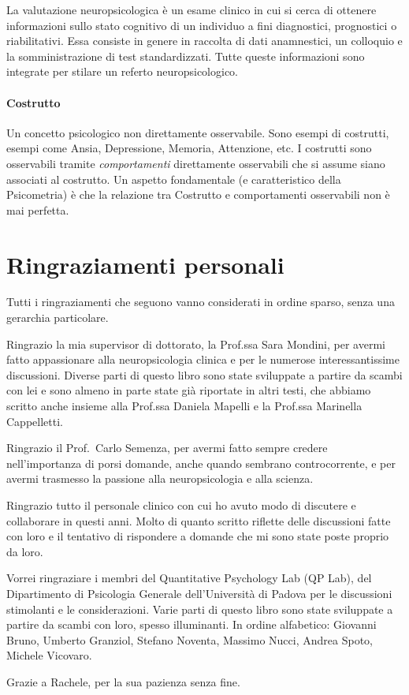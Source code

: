 \documentclass[
  italian,
  letterpaper,
  paper=6in:9in,
  pagesize=pdftex,
  headinclude=on,
  footinclude=on,
  11pt]{scrbook}
\begin{document}
La valutazione neuropsicologica è un esame clinico in cui si cerca di
ottenere informazioni sullo stato cognitivo di un individuo a fini
diagnostici, prognostici o riabilitativi. Essa consiste in genere in
raccolta di dati anamnestici, un colloquio e la somministrazione di test
standardizzati. Tutte queste informazioni sono integrate per stilare un
referto neuropsicologico.

\subsubsection*{Costrutto}\label{costrutto}

Un concetto psicologico non direttamente osservabile. Sono esempi di
costrutti, esempi come Ansia, Depressione, Memoria, Attenzione, etc. I
costrutti sono osservabili tramite \emph{comportamenti} direttamente
osservabili che si assume siano associati al costrutto. Un aspetto
fondamentale (e caratteristico della Psicometria) è che la relazione tra
Costrutto e comportamenti osservabili non è mai perfetta.

\chapter*{Ringraziamenti personali}\label{ringraziamenti_personali}


Tutti i ringraziamenti che seguono vanno considerati in ordine sparso,
senza una gerarchia particolare.

Ringrazio la mia supervisor di dottorato, la Prof.ssa Sara Mondini, per
avermi fatto appassionare alla neuropsicologia clinica e per le numerose
interessantissime discussioni. Diverse parti di questo libro sono state
sviluppate a partire da scambi con lei e sono almeno in parte state già
riportate in altri testi, che abbiamo scritto anche insieme alla
Prof.ssa Daniela Mapelli e la Prof.ssa Marinella Cappelletti.

Ringrazio il Prof.~Carlo Semenza, per avermi fatto sempre credere
nell'importanza di porsi domande, anche quando sembrano controcorrente,
e per avermi trasmesso la passione alla neuropsicologia e alla scienza.

Ringrazio tutto il personale clinico con cui ho avuto modo di discutere
e collaborare in questi anni. Molto di quanto scritto riflette delle
discussioni fatte con loro e il tentativo di rispondere a domande che mi
sono state poste proprio da loro.

Vorrei ringraziare i membri del Quantitative Psychology Lab (QP Lab),
del Dipartimento di Psicologia Generale dell'Università di Padova per le
discussioni stimolanti e le considerazioni. Varie parti di questo libro
sono state sviluppate a partire da scambi con loro, spesso illuminanti.
In ordine alfabetico: Giovanni Bruno, Umberto Granziol, Stefano Noventa,
Massimo Nucci, Andrea Spoto, Michele Vicovaro.

Grazie a Rachele, per la sua pazienza senza fine.


\backmatter
\end{document}
